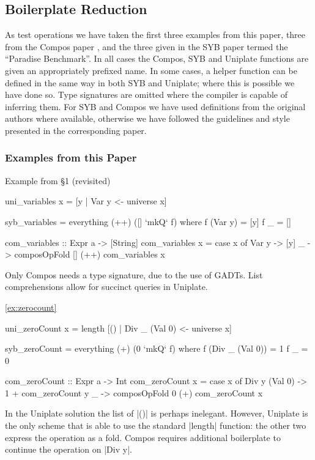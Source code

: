 \subsection{Boilerplate Reduction}
\label{sec:results_boilerplate}

As test operations we have taken the first three examples from this paper, three from the Compos paper \citep{bringert:compos}, and the three given in the SYB paper \citep{lammel:syb} termed the ``Paradise Benchmark''. In all cases the Compos, SYB and Uniplate functions are given an appropriately prefixed name. In some cases, a helper function can be defined in the same way in both SYB and Uniplate; where this is possible we have done so. Type signatures are omitted where the compiler is capable of inferring them. For SYB and Compos we have used definitions from the original authors where available, otherwise we have followed the guidelines and style presented in the corresponding paper.

\subsubsection{Examples from this Paper}

\begin{exampleany}{Example from \S1 (revisited)}

\ignore\begin{code}
uni_variables x = [y | Var y <- universe x]

syb_variables = everything (++) ([] `mkQ` f)
    where  f (Var y)  = [y]
           f _        = []

com_variables :: Expr a -> [String]
com_variables x = case x of
    Var y -> [y]
    _ -> composOpFold [] (++) com_variables x
\end{code}

Only Compos needs a type signature, due to the use of GADTs. List comprehensions allow for succinct queries in Uniplate.
\end{exampleany}

\begin{examplerevisit}{\ref{ex:zerocount}}

\ignore\begin{code}
uni_zeroCount x = length [() | Div _ (Val 0) <- universe x]

syb_zeroCount = everything (+) (0 `mkQ` f)
    where  f (Div _ (Val 0))  = 1
           f _                = 0

com_zeroCount :: Expr a -> Int
com_zeroCount x = case x of
    Div y (Val 0) -> 1 + com_zeroCount y
    _ -> composOpFold 0 (+) com_zeroCount x
\end{code}

In the Uniplate solution the list of |()| is perhaps inelegant. However, Uniplate is the only scheme that is able to use the standard |length| function: the other two express the operation as a fold. Compos requires additional boilerplate to continue the operation on |Div y|.
\end{examplerevisit}

